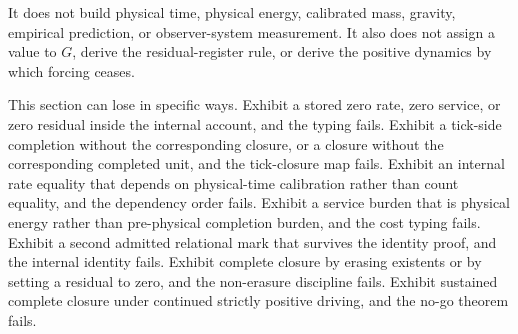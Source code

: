 It does not build physical time, physical energy, calibrated mass, gravity, empirical prediction, or observer-system measurement. It also does not assign a value to \(G\), derive the residual-register rule, or derive the positive dynamics by which forcing ceases.

This section can lose in specific ways. Exhibit a stored zero rate, zero service, or zero residual inside the internal account, and the typing fails. Exhibit a tick-side completion without the corresponding closure, or a closure without the corresponding completed unit, and the tick-closure map fails. Exhibit an internal rate equality that depends on physical-time calibration rather than count equality, and the dependency order fails. Exhibit a service burden that is physical energy rather than pre-physical completion burden, and the cost typing fails. Exhibit a second admitted relational mark that survives the identity proof, and the internal identity fails. Exhibit complete closure by erasing existents or by setting a residual to zero, and the non-erasure discipline fails. Exhibit sustained complete closure under continued strictly positive driving, and the no-go theorem fails.


